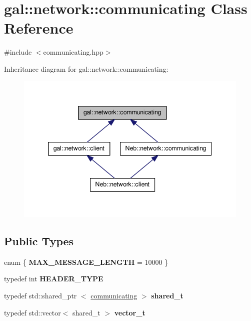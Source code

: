 \hypertarget{classgal_1_1network_1_1communicating}{\section{gal\-:\-:network\-:\-:communicating \-Class \-Reference}
\label{classgal_1_1network_1_1communicating}
}


{\ttfamily \#include $<$communicating.\-hpp$>$}



\-Inheritance diagram for gal\-:\-:network\-:\-:communicating\-:\nopagebreak
\begin{figure}[H]
\begin{center}
\leavevmode
\includegraphics[width=342pt]{classgal_1_1network_1_1communicating__inherit__graph}
\end{center}
\end{figure}
\subsection*{\-Public \-Types}
\begin{DoxyCompactItemize}
\item 
enum \{ {\bfseries \-M\-A\-X\-\_\-\-M\-E\-S\-S\-A\-G\-E\-\_\-\-L\-E\-N\-G\-T\-H} =  10000
 \}
\item 
\hypertarget{classgal_1_1network_1_1communicating_aef6c11aca9b227ec65e289b5f194cd83}{typedef int {\bfseries \-H\-E\-A\-D\-E\-R\-\_\-\-T\-Y\-P\-E}}\label{classgal_1_1network_1_1communicating_aef6c11aca9b227ec65e289b5f194cd83}

\item 
\hypertarget{classgal_1_1network_1_1communicating_a20c6f2dc53a296b6b34a82d5dc8f894a}{typedef std\-::shared\-\_\-ptr\*
$<$ \hyperlink{classgal_1_1network_1_1communicating}{communicating} $>$ {\bfseries shared\-\_\-t}}\label{classgal_1_1network_1_1communicating_a20c6f2dc53a296b6b34a82d5dc8f894a}

\item 
\hypertarget{classgal_1_1network_1_1communicating_acde720b70acbd7aecc86d2ebd4d91113}{typedef std\-::vector$<$ shared\-\_\-t $>$ {\bfseries vector\-\_\-t}}\label{classgal_1_1network_1_1communicating_acde720b70acbd7aecc86d2ebd4d91113}

\end{DoxyCompactItemize}
